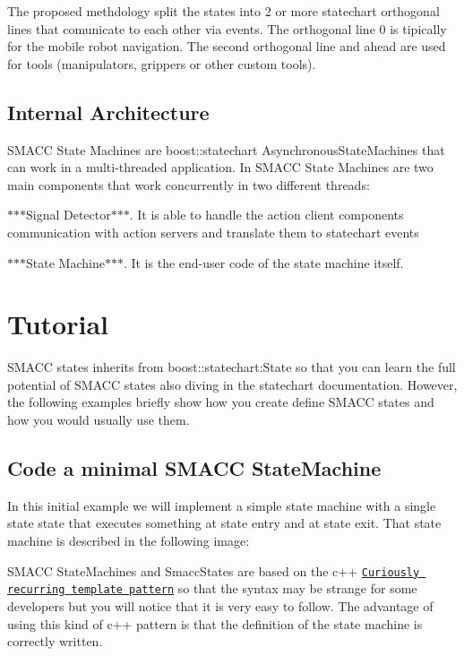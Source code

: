 The proposed methdology split the states into 2 or more statechart orthogonal lines that comunicate to each other via events. The orthogonal line 0 is tipically for the mobile robot navigation. The second orthogonal line and ahead are used for tools (manipulators, grippers or other custom tools).

 

\subsection*{Internal Architecture}

S\+M\+A\+CC State Machines are boost\+::statechart Asynchronous\+State\+Machines that can work in a multi-\/threaded application. In S\+M\+A\+CC State Machines are two main components that work concurrently in two different threads\+:


\begin{DoxyItemize}
\item $\ast$$\ast$$\ast$\+Signal Detector$\ast$$\ast$$\ast$. It is able to handle the action client components communication with action servers and translate them to statechart events
\item $\ast$$\ast$$\ast$\+State Machine$\ast$$\ast$$\ast$. It is the end-\/user code of the state machine itself.
\end{DoxyItemize}

 

\section*{Tutorial}

S\+M\+A\+CC states inherits from boost\+::statechart\+:State so that you can learn the full potential of S\+M\+A\+CC states also diving in the statechart documentation. However, the following examples briefly show how you create define S\+M\+A\+CC states and how you would usually use them.

\subsection*{Code a minimal S\+M\+A\+CC State\+Machine}

In this initial example we will implement a simple state machine with a single state state that executes something at state entry and at state exit. That state machine is described in the following image\+:

 

S\+M\+A\+CC State\+Machines and Smacc\+States are based on the c++ \href{https://en.wikipedia.org/wiki/Curiously_recurring_template_pattern}{\tt Curiously recurring template pattern} so that the syntax may be strange for some developers but you will notice that it is very easy to follow. The advantage of using this kind of c++ pattern is that the definition of the state machine is correctly written.

